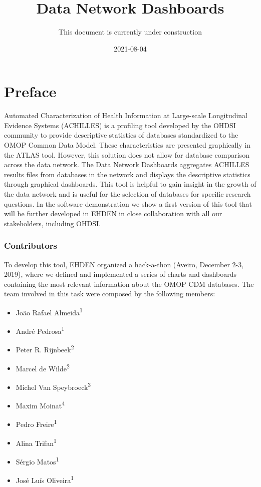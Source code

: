 \documentclass[
]{book}
\title{Data Network Dashboards}
\author{This document is currently under construction}
\date{2021-08-04}
\providecommand{\tightlist}{%
  \setlength{\itemsep}{0pt}\setlength{\parskip}{0pt}}
\begin{document}
\maketitle

{
\setcounter{tocdepth}{1}
\tableofcontents
}
\hypertarget{preface}{%
\chapter{Preface}\label{preface}}

Automated Characterization of Health Information at Large-scale Longitudinal Evidence Systems (ACHILLES) is a profiling tool developed by the OHDSI community to provide descriptive statistics of databases standardized to the OMOP Common Data Model. These characteristics are presented graphically in the ATLAS tool. However, this solution does not allow for database comparison across the data network. The Data Network Dashboards aggregates ACHILLES results files from databases in the network and displays the descriptive statistics through graphical dashboards. This tool is helpful to gain insight in the growth of the data network and is useful for the selection of databases for specific research questions. In the software demonstration we show a first version of this tool that will be further developed in EHDEN in close collaboration with all our stakeholders, including OHDSI.

\hypertarget{contributors}{%
\subsection*{Contributors}\label{contributors}}

To develop this tool, EHDEN organized a hack-a-thon (Aveiro, December 2-3, 2019), where we defined and implemented a series of charts and dashboards containing the most relevant information about the OMOP CDM databases. The team involved in this task were composed by the following members:

\begin{itemize}
\tightlist
\item
  João Rafael Almeida\textsuperscript{1}
\item
  André Pedrosa\textsuperscript{1}
\item
  Peter R. Rijnbeek\textsuperscript{2}
\item
  Marcel de Wilde\textsuperscript{2}
\item
  Michel Van Speybroeck\textsuperscript{3}
\item
  Maxim Moinat\textsuperscript{4}
\item
  Pedro Freire\textsuperscript{1}
\item
  Alina Trifan\textsuperscript{1}
\item
  Sérgio Matos\textsuperscript{1}
\item
  José Luís Oliveira\textsuperscript{1}
\end{itemize}
\end{document}
